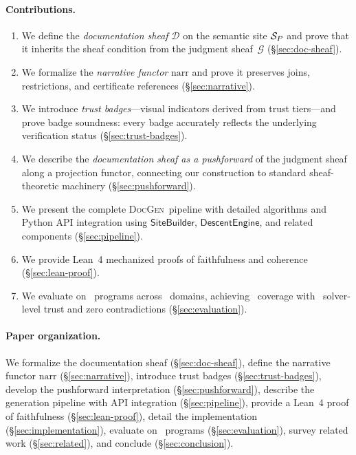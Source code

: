 \documentclass[11pt]{article}
\newcommand{\DocGen}{\textsc{DocGen}}
\newcommand{\DocSheaf}{\mathcal{D}}
\newcommand{\NarrFunc}{\mathrm{narr}}
\begin{document}
\paragraph{Contributions.}
\begin{enumerate}[noitemsep]
\item We define the \emph{documentation sheaf} $\DocSheaf$ on the
  semantic site $\mathcal{S}_P$ and prove that it inherits the sheaf
  condition from the judgment sheaf~$\mathcal{G}$
  (§\ref{sec:doc-sheaf}).
\item We formalize the \emph{narrative functor} $\NarrFunc$ and prove
  it preserves joins, restrictions, and certificate references
  (§\ref{sec:narrative}).
\item We introduce \emph{trust badges}---visual indicators derived
  from trust tiers---and prove badge soundness: every badge accurately
  reflects the underlying verification status
  (§\ref{sec:trust-badges}).
\item We describe the \emph{documentation sheaf as a pushforward}
  of the judgment sheaf along a projection functor, connecting our
  construction to standard sheaf-theoretic machinery
  (§\ref{sec:pushforward}).
\item We present the complete \DocGen\ pipeline with detailed
  algorithms and Python API integration using
  $\mathsf{SiteBuilder}$, $\mathsf{DescentEngine}$, and related
  components (§\ref{sec:pipeline}).
\item We provide Lean~4 mechanized proofs of faithfulness and
  coherence (§\ref{sec:lean-proof}).
\item We evaluate on \compTotalPrograms\ programs across
  \expDomainCount\ domains, achieving \compOverallAccuracy\
  coverage with \compTrustSolverdischargedPct\ solver-level trust
  and zero contradictions (§\ref{sec:evaluation}).
\end{enumerate}

\paragraph{Paper organization.}
We formalize the documentation sheaf (§\ref{sec:doc-sheaf}), define the
narrative functor $\NarrFunc$ (§\ref{sec:narrative}), introduce trust
badges (§\ref{sec:trust-badges}), develop the pushforward
interpretation (§\ref{sec:pushforward}), describe the generation
pipeline with API integration
(§\ref{sec:pipeline}), provide a Lean~4 proof of faithfulness
(§\ref{sec:lean-proof}), detail the implementation
(§\ref{sec:implementation}), evaluate on \compTotalPrograms\ programs
(§\ref{sec:evaluation}), survey related work (§\ref{sec:related}),
and conclude (§\ref{sec:conclusion}).
\end{document}
